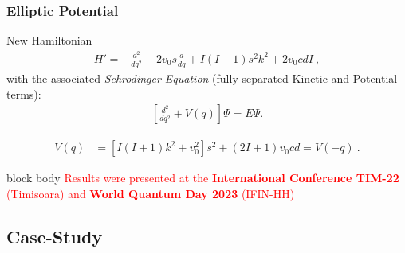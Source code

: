 \documentclass{beamer}
\begin{document}
\begin{frame}
	\frametitle{Elliptic Potential}
	\begin{exampleblock}{New Hamiltonian}
		\begin{align}
			H'=-\frac{d^2}{dq^2}-2v_0s\frac{d}{dq}+I(I+1)s^2k^2+2v_0cdI\ ,\nonumber
		\end{align}
		with the associated \emph{Schrodinger Equation} (fully separated Kinetic and Potential terms):
		\begin{align}
			\left[\frac{d^2}{dq^2}+V(q)\right]\Psi=E\Psi.\nonumber
		\end{align}
	\end{exampleblock}
	\begin{align}
			V(q)&=\left[I(I+1)k^2+v_0^2\right]s^2+(2I+1)v_0cd=V(-q)\ .
	\end{align}
	\begin{beamercolorbox}[rounded=true,shadow=false, wd=\linewidth,]{block body}
		\centering
		\textcolor{red}{\footnotesize{Results were presented at the \textbf{International Conference TIM-22} (Timisoara) and \textbf{World Quantum Day 2023} (IFIN-HH)}}
	\end{beamercolorbox}
\end{frame}

\subsection{Case-Study}
\end{document}
